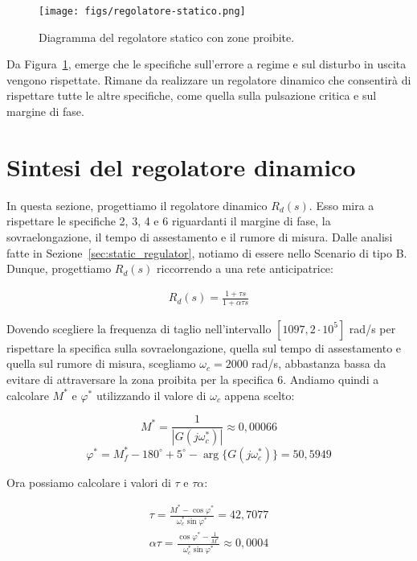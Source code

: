 \documentclass[a4paper, 11pt]{article}
\begin{document}
\begin{figure}[H]
    \centering
    \texttt{[image: figs/regolatore-statico.png]}
    \caption{Diagramma del regolatore statico con zone proibite.}
    \label{DiagrammaRegolatoreStatico}
\end{figure}

Da Figura~\ref{DiagrammaRegolatoreStatico}, emerge che le specifiche sull'errore a regime e sul disturbo in uscita vengono rispettate. Rimane da realizzare un regolatore dinamico che consentirà di rispettare tutte le altre specifiche, come quella sulla pulsazione critica e sul margine di fase.

\newpage
\section{Sintesi del regolatore dinamico}

In questa sezione, progettiamo il regolatore dinamico $R_d(s)$. Esso mira a rispettare le specifiche 2, 3, 4 e 6 riguardanti il margine di fase, la sovraelongazione, il tempo di assestamento e il rumore di misura.
Dalle analisi fatte in Sezione~\ref{sec:static_regulator}, notiamo di essere nello Scenario di tipo B. Dunque, progettiamo $R_d(s)$ riccorrendo a  una rete anticipatrice:

\begin{align}
    R_d(s) = \frac{1+\tau s}{1+\alpha\tau s}
\end{align}

Dovendo scegliere la frequenza di taglio nell'intervallo $[1097, 2 \cdot 10^5]$ rad/s per rispettare la specifica sulla sovraelongazione, quella sul tempo di assestamento e quella sul rumore di misura, scegliamo $\omega_c = 2000$ rad/s, abbastanza bassa da evitare di attraversare la zona proibita per la specifica 6. Andiamo quindi a calcolare $M^*$ e $\varphi^*$ utilizzando il valore di $\omega_c$ appena scelto:

\[M^* = \frac{1}{|G(j\omega_c^*)|} \approx 0,00066 \]
\[\varphi^* = M_f^* -180^\circ + 5^\circ - \arg\{G(j\omega_c^*)\} = 50,5949 \]

Ora possiamo calcolare i valori di $\tau$ e $\tau\alpha$:

\begin{subequations}
\begin{align}
    \tau = \frac {M^* - \cos \varphi^*} {\omega_c^* \sin \varphi^*} = 42,7077
    \\ \alpha\tau = \frac {\cos \varphi^* - \frac 1 {M^*}} {\omega_c^* \sin \varphi^*} \approx 0,0004
\end{align}
\end{subequations}
\end{document}
